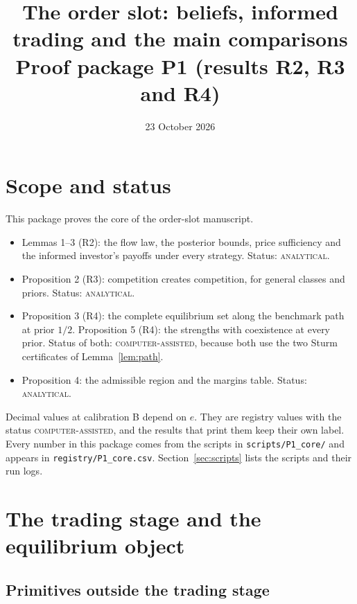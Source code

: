\documentclass[11pt]{article}
\title{The order slot: beliefs, informed trading and the main comparisons\\[2pt]
\large Proof package P1 (results R2, R3 and R4)}
\author{}
\date{23 October 2026}
\theoremstyle{definition}
\newcommand{\lab}[1]{\textsc{#1}}
\begin{document}
\maketitle

\section*{Scope and status}

This package proves the core of the order-slot manuscript.
\begin{itemize}
\item Lemmas 1--3 (R2): the flow law, the posterior bounds, price sufficiency and the informed investor's
  payoffs under every strategy. Status: \lab{analytical}.
\item Proposition 2 (R3): competition creates competition, for general classes and priors.
  Status: \lab{analytical}.
\item Proposition 3 (R4): the complete equilibrium set along the benchmark path at prior $1/2$.
  Proposition 5 (R4): the strengths with coexistence at every prior. Status of both: \lab{computer-assisted},
  because both use the two Sturm certificates of Lemma~\ref{lem:path}.
\item Proposition 4: the admissible region and the margins table. Status: \lab{analytical}.
\end{itemize}
Decimal values at calibration B depend on $e$. They are registry values with the status
\lab{computer-assisted}, and the results that print them keep their own label.
Every number in this package comes from the scripts in \texttt{scripts/P1\_core/} and appears in
\texttt{registry/P1\_core.csv}. Section~\ref{sec:scripts} lists the scripts and their run logs.

\section{The trading stage and the equilibrium object}\label{sec:model}

\subsection{Primitives outside the trading stage}
\end{document}
